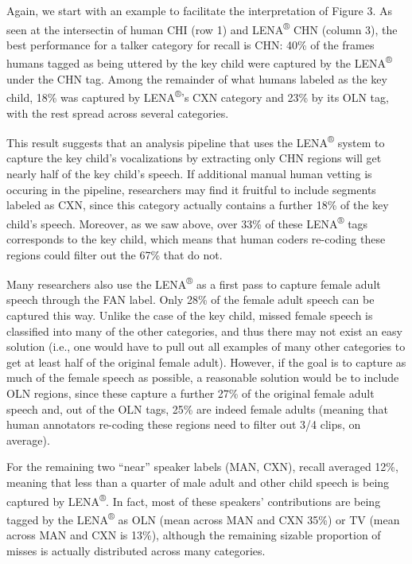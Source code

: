 \documentclass[english,floatsintext,man]{apa6}
\begin{document}
Again, we start with an example to facilitate the interpretation of
Figure 3. As seen at the intersectin of human CHI (row 1) and
LENA\textsuperscript{®} CHN (column 3), the best performance for a
talker category for recall is CHN: 40\% of the frames humans tagged as
being uttered by the key child were captured by the
LENA\textsuperscript{®} under the CHN tag. Among the remainder of what
humans labeled as the key child, 18\% was captured by
LENA\textsuperscript{®}'s CXN category and 23\% by its OLN tag, with the
rest spread across several categories.

This result suggests that an analysis pipeline that uses the
LENA\textsuperscript{®} system to capture the key child's vocalizations
by extracting only CHN regions will get nearly half of the key child's
speech. If additional manual human vetting is occuring in the pipeline,
researchers may find it fruitful to include segments labeled as CXN,
since this category actually contains a further 18\% of the key child's
speech. Moreover, as we saw above, over 33\% of these
LENA\textsuperscript{®} tags corresponds to the key child, which means
that human coders re-coding these regions could filter out the 67\% that
do not.

Many researchers also use the LENA\textsuperscript{®} as a first pass to
capture female adult speech through the FAN label. Only 28\% of the
female adult speech can be captured this way. Unlike the case of the key
child, missed female speech is classified into many of the other
categories, and thus there may not exist an easy solution (i.e., one
would have to pull out all examples of many other categories to get at
least half of the original female adult). However, if the goal is to
capture as much of the female speech as possible, a reasonable solution
would be to include OLN regions, since these capture a further 27\% of
the original female adult speech and, out of the OLN tags, 25\% are
indeed female adults (meaning that human annotators re-coding these
regions need to filter out 3/4 clips, on average).

For the remaining two \enquote{near} speaker labels (MAN, CXN), recall
averaged 12\%, meaning that less than a quarter of male adult and other
child speech is being captured by LENA\textsuperscript{®}. In fact, most
of these speakers' contributions are being tagged by the
LENA\textsuperscript{®} as OLN (mean across MAN and CXN 35\%) or TV
(mean across MAN and CXN is 13\%), although the remaining sizable
proportion of misses is actually distributed across many categories.
\end{document}
